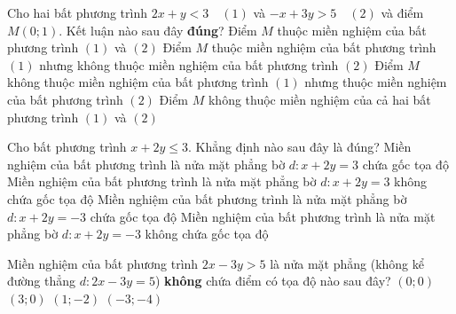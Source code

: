 \begin{ex}%
	Cho hai bất phương trình $2x+y<3\quad (1)$ và $-x+3y>5\quad (2)$ và điểm  $M(0;1)$. Kết luận nào sau đây \textbf{đúng}?
	\choice 
		{Điểm $M$ thuộc miền  nghiệm của bất phương trình $(1)$ và $(2)$}
		{\True Điểm $M$ thuộc miền nghiệm của bất phương trình $(1)$  nhưng không thuộc miền nghiệm của bất phương trình $(2)$}
		{Điểm $M$ không thuộc  miền nghiệm của bất phương trình $(1)$ nhưng thuộc miền nghiệm của bất phương trình $(2)$}
		 {Điểm $M$ không thuộc miền nghiệm của cả hai bất phương trình $(1)$ và $(2)$}
\end{ex}

\begin{ex}%
	Cho bất  phương trình $x+2y\le 3$. Khẳng định nào sau đây là đúng?
	 \choice
		{\True Miền nghiệm của bất phương trình là nửa mặt phẳng bờ $d:x+2y=3$ chứa  gốc tọa độ}
		{Miền nghiệm của bất phương trình là nửa mặt phẳng bờ $d:x+2y=3$ không chứa gốc  tọa độ}
		{Miền nghiệm của bất phương trình là nửa mặt  phẳng bờ $d:x+2y=-3$ chứa gốc tọa độ}
		 {Miền nghiệm của bất phương trình là nửa mặt phẳng bờ $d:x+2y=-3$ không chứa gốc tọa độ}
\end{ex}

\begin{ex}%
	Miền nghiệm của bất phương trình $2x-3y>5$ là nửa mặt phẳng (không kể đường thẳng $d:2x-3y=5$) \textbf{không} chứa điểm  có tọa độ nào sau đây?
	 \choice
		{\True $(0;0)$} 
		 {$(3;0)$}
		{$(1;-2)$} 
		 {$(-3;-4)$}
\end{ex}

